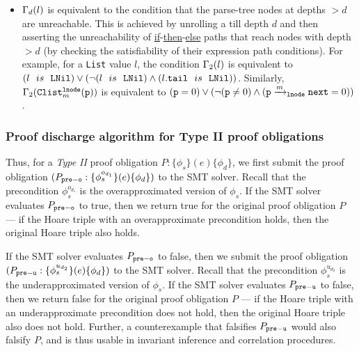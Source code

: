 \begin{itemize}

\item $\Gamma_d(l)$ is equivalent to the condition
that the parse-tree nodes at depths
$>d$ are unreachable. This is achieved by unrolling a \recursiveRelation{}
till depth $d$ and then asserting the unreachability
of
\underline{if}-\underline{then}-\underline{else}
paths that reach nodes with depth $>d$ (by checking the
satisfiability of their expression path conditions).
For example, for a {\tt List} value $l$,
the condition
$\Gamma_2(l)$ is equivalent to
$(l\ \ is\ \ {\tt LNil}) \vee (\neg(l\ \ is\ \ {\tt LNil})\land(l{\tt .tail}\ \ is\ \ {\tt LNil}))$.
Similarly,
$\Gamma_2({\tt Clist}^{{\tt lnode}}_{m}({\tt p}))$
is equivalent to
$({\tt p}=0) \vee (\neg({\tt p}\neq 0)\land({\tt p}\xrightarrow[]{m}_{{\tt lnode}}\mathrm{\tt next}=0))$.
\end{itemize}

\subsubsection{Proof discharge algorithm for Type II proof obligations}
\label{sec:cat2algo}
Thus, for a {\em Type II} proof obligation
$P: \{\phi_s\} (e) \{\phi_d\}$, we first
submit the proof obligation
$(P_{{\tt pre-o}}: \{\phi^{o_{d_1}}_s\} (e) \{\phi_d\})$
to the SMT solver. Recall that the precondition $\phi^{o_{d_1}}_s$
is the overapproximated version
of $\phi_s$.
If the SMT solver evaluates
$P_{{\tt pre-o}}$ to true, then we return true for
the original proof obligation $P$ --- if the
Hoare triple with an overapproximate precondition
holds, then the original Hoare triple
also holds.

If the
SMT solver evaluates
$P_{{\tt pre-o}}$ to false, then we submit
the proof obligation
$(P_{{\tt pre-u}}: \{\phi^{u_{d_2}}_s\} (e) \{\phi_d\})$
to the SMT solver. Recall that the precondition $\phi^{u_{d_2}}_s$
is the underapproximated version of $\phi_s$.
If the SMT solver evaluates
$P_{{\tt pre-u}}$ to false, then we return false for
the original proof obligation $P$ --- if the
Hoare triple with an underapproximate precondition
does not hold, then the original Hoare triple
also does not hold. Further, a counterexample that
falsifies $P_{{\tt pre-u}}$ would also falsify $P$,
and is thus usable in invariant inference and correlation procedures.

